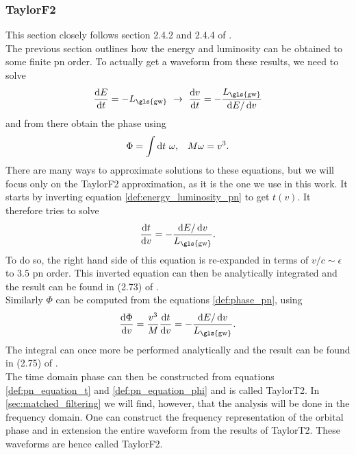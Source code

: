 \subsubsection{TaylorF2}
This section closely follows section 2.4.2 and 2.4.4 of \cite{frank_phd}.\\
The previous section outlines how the energy and luminosity can be obtained to some finite \gls{pn} order. To actually get a waveform from these results, we need to solve
\begin{equation}\label{def:energy_luminosity_pn}
\frac{\diff E}{\diff t}=-L_\text{\gls{gw}}\ \rightarrow\ \frac{\diff v}{\diff t}=-\frac{L_\text{\gls{gw}}}{\diff E / \diff v}
\end{equation}
and from there obtain the phase using
\begin{align}\label{def:phase_pn}
&\Phi = \int \mathop{}\!\mathrm{d} t\ \omega,& M\omega=v^3.
\end{align}
There are many ways to approximate solutions to these equations, but we will focus only on the TaylorF2 approximation, as it is the one we use in this work. It starts by inverting equation \eqref{def:energy_luminosity_pn} to get $t(v)$. It therefore tries to solve
\begin{equation}\label{def:pn_equation_t}
\frac{\diff t}{\diff v}=-\frac{\diff E / \diff v}{L_\text{\gls{gw}}}.
\end{equation}
To do so, the right hand side of this equation is re-expanded in terms of $v/c\sim \epsilon$ to $3.5$ \gls{pn} order. This inverted equation can then be analytically integrated and the result can be found in (2.73) of \cite{frank_phd}.\\
Similarly $\Phi$ can be computed from the equations \eqref{def:phase_pn}, using
\begin{equation}\label{def:pn_equation_phi}
\frac{\diff \Phi}{\diff v} = \frac{v^3}{M}\frac{\diff t}{\diff v}=-\frac{\diff E / \diff v}{L_\text{\gls{gw}}}.
\end{equation}
The integral can once more be performed analytically and the result can be found in (2.75) of \cite{frank_phd}.\\
The time domain phase can then be constructed from equations \eqref{def:pn_equation_t} and \eqref{def:pn_equation_phi} and is called TaylorT2. In \autoref{sec:matched_filtering} we will find, however, that the analysis will be done in the frequency domain. One can construct the frequency representation of the orbital phase and in extension the entire waveform from the results of TaylorT2. These waveforms are hence called TaylorF2.
